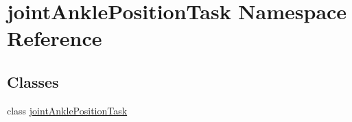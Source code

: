 \hypertarget{namespacejoint_ankle_position_task}{}\section{joint\+Ankle\+Position\+Task Namespace Reference}
\label{namespacejoint_ankle_position_task}
\subsection*{Classes}
\begin{DoxyCompactItemize}
\item 
class \hyperlink{classjoint_ankle_position_task_1_1joint_ankle_position_task}{joint\+Ankle\+Position\+Task}
\end{DoxyCompactItemize}
